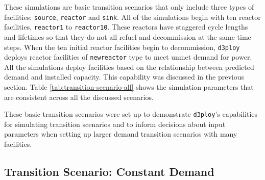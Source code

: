 \documentclass{anstrans}
\newcommand{\deploy}{\texttt{d3ploy}\xspace}%
\begin{document}
These simulations are basic transition scenarios that only include
three types of facilities: \texttt{source}, \texttt{reactor} and 
\texttt{sink}.
All of the simulations begin with ten reactor facilities, 
\texttt{reactor1} to \texttt{reactor10}. 
These reactors have staggered cycle lengths and lifetimes 
so that they do not all refuel and decommission at the same time 
steps. 
When the ten initial reactor facilities begin to decommission, 
\deploy deploys reactor facilities of \texttt{newreactor} type
to meet unmet demand for power. 
All the simulations deploy facilities based on the relationship
between predicted demand and installed capacity. 
This capability was discussed in the previous section.  
Table \ref{tab:transition-scenario-all} shows the simulation 
parameters that are consistent across all the discussed 
scenarios. 

These basic transition scenarios were set up to 
demonstrate \deploy's capabilities for simulating 
transition scenarios and 
to inform decisions about input parameters when setting up larger 
demand transition scenarios with many facilities. 

\subsection{\textbf{Transition Scenario: Constant Demand}}
\end{document}
